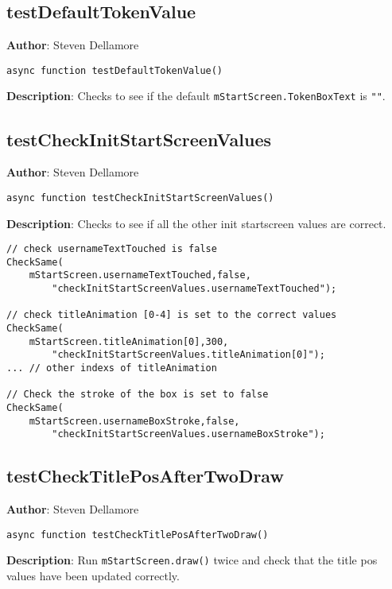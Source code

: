 \documentclass[12pt]{article}
\begin{document}
\subsection{testDefaultTokenValue}
\textbf{Author}: Steven Dellamore 
\vspace*{1\baselineskip}
\begin{lstlisting}
async function testDefaultTokenValue()
\end{lstlisting} 
\vspace*{1\baselineskip}
\textbf{Description}: Checks to see if the default \texttt{mStartScreen.TokenBoxText} is \texttt{""}. 



\subsection{testCheckInitStartScreenValues}
\textbf{Author}: Steven Dellamore 
\vspace*{1\baselineskip}
\begin{lstlisting}
async function testCheckInitStartScreenValues()
\end{lstlisting} 
\vspace*{1\baselineskip}
\textbf{Description}: Checks to see if all the other init startscreen values are correct. 
\begin{verbatim}
// check usernameTextTouched is false
CheckSame(
    mStartScreen.usernameTextTouched,false,
        "checkInitStartScreenValues.usernameTextTouched");

// check titleAnimation [0-4] is set to the correct values
CheckSame(
    mStartScreen.titleAnimation[0],300,
        "checkInitStartScreenValues.titleAnimation[0]");
... // other indexs of titleAnimation

// Check the stroke of the box is set to false
CheckSame(
    mStartScreen.usernameBoxStroke,false,
        "checkInitStartScreenValues.usernameBoxStroke");
\end{verbatim}
 



\subsection{testCheckTitlePosAfterTwoDraw}
\textbf{Author}: Steven Dellamore 
\vspace*{1\baselineskip}
\begin{lstlisting}
async function testCheckTitlePosAfterTwoDraw()
\end{lstlisting} 
\vspace*{1\baselineskip}
\textbf{Description}: Run \texttt{mStartScreen.draw()} twice and check that the title pos values have been updated correctly. 
\end{document}
